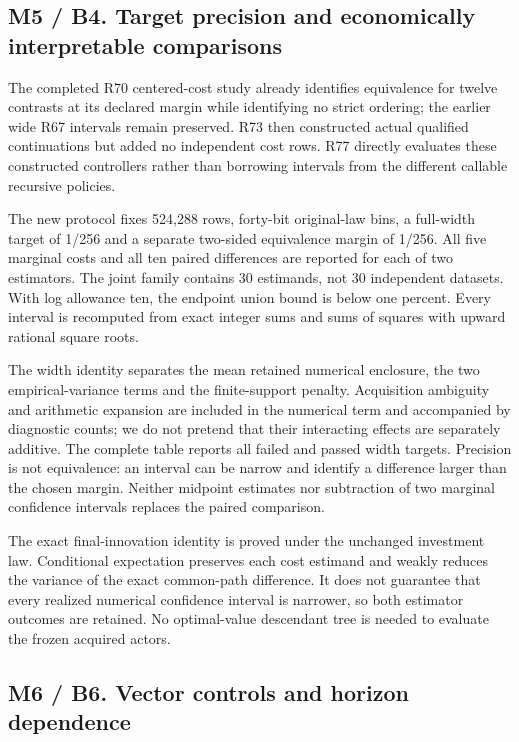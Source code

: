 \hypertarget{m5-b4.-target-precision-and-economically-interpretable-comparisons}{%
\subsection{M5 / B4. Target precision and economically interpretable
comparisons}\label{m5-b4.-target-precision-and-economically-interpretable-comparisons}}

The completed R70 centered-cost study already identifies equivalence for
twelve contrasts at its declared margin while identifying no strict
ordering; the earlier wide R67 intervals remain preserved. R73 then
constructed actual qualified continuations but added no independent cost
rows. R77 directly evaluates these constructed controllers rather than
borrowing intervals from the different callable recursive policies.

The new protocol fixes 524,288 rows, forty-bit original-law bins, a
full-width target of 1/256 and a separate two-sided equivalence margin
of 1/256. All five marginal costs and all ten paired differences are
reported for each of two estimators. The joint family contains 30
estimands, not 30 independent datasets. With log allowance ten, the
endpoint union bound is below one percent. Every interval is recomputed
from exact integer sums and sums of squares with upward rational square
roots.

The width identity separates the mean retained numerical enclosure, the
two empirical-variance terms and the finite-support penalty. Acquisition
ambiguity and arithmetic expansion are included in the numerical term
and accompanied by diagnostic counts; we do not pretend that their
interacting effects are separately additive. The complete table reports
all failed and passed width targets. Precision is not equivalence: an
interval can be narrow and identify a difference larger than the chosen
margin. Neither midpoint estimates nor subtraction of two marginal
confidence intervals replaces the paired comparison.

The exact final-innovation identity is proved under the unchanged
investment law. Conditional expectation preserves each cost estimand and
weakly reduces the variance of the exact common-path difference. It does
not guarantee that every realized numerical confidence interval is
narrower, so both estimator outcomes are retained. No optimal-value
descendant tree is needed to evaluate the frozen acquired actors.

\hypertarget{m6-b6.-vector-controls-and-horizon-dependence}{%
\subsection{M6 / B6. Vector controls and horizon
dependence}\label{m6-b6.-vector-controls-and-horizon-dependence}}

